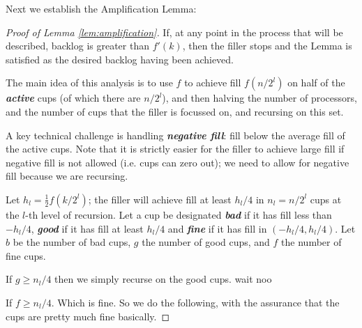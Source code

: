 \documentclass[twocolumn]{article}[11pt]
\newcommand{\defn}[1]{{\textit{\textbf{\boldmath #1}}}}
\begin{document}
Next we establish the Amplification Lemma:
\begin{proof}[Proof of Lemma \ref{lem:amplification}]

  If, at any point in the process that will be described, backlog is greater
  than $f'(k)$, then the filler stops and the Lemma is satisfied as the desired
  backlog having been achieved.

  The main idea of this analysis is to use $f$ to achieve fill $f(n/2^l)$ on
  half of the \defn{active} cups (of which there are $n/2^l$), and then halving
  the number of processors, and the number of cups that the filler is focussed
  on, and recursing on this set. 

  A key technical challenge is handling \defn{negative fill}: fill below
  the average fill of the active cups. Note that it is strictly
  easier for the filler to achieve large fill if negative fill is not allowed
  (i.e. cups can zero out); we need to allow for negative fill because we are
  recursing. 



  Let $h_l = \frac{1}{2}f(k/2^l)$; the filler will achieve fill at least
  $h_l/4$ in $n_l = n/2^{l}$ cups at the $l$-th level of recursion. Let a cup
  be designated \defn{bad} if it has fill less than $-h_l/4$, \defn{good} if it
  has fill at least $h_l/4$ and \defn{fine} if it has fill in
  $(-h_l/4, h_l/4)$. Let $b$ be the number of bad cups, $g$
  the number of good cups, and $f$ the number of fine cups.

  If $g \ge n_l/4$ then we simply recurse on the good cups. {\color{red} wait noo}

  If $f \ge n_l/4$. Which is fine. So we do the following, with the assurance
  that the cups are pretty much fine basically.




\end{proof}
\end{document}

